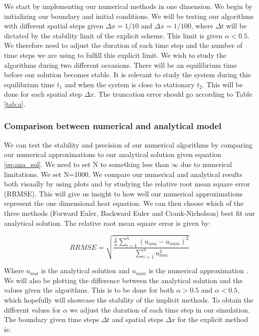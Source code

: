 \documentclass{article}
\begin{document}
\begin{multicols}{2}
We start by implementing our numerical methods in one dimension. We begin by initializing our boundary and initial conditions. We will be testing our algorithms with different spatial steps given $\Delta x =1/10$ and $\Delta x = 1/100$, where $\Delta t$ will be dictated by the stability limit of the explicit scheme. This limit is given $\alpha<0.5$. We therefore need to adjust the duration of each time step and the number of time steps we are using to fulfill this explicit limit. We wish to study the algorithms during two different occasions. There will be an equilibrium time before our solution becomes stable. It is relevant to study the system during this equilibrium time $t_1$ and when the system is close to stationary $t_2$. This will be done for each spatial step $\Delta x$. The truncation error should go according to Table \ref{tab:a}.

\subsubsection{Comparison between numerical and analytical model}

We can test the stability and precision of our numerical algorithms by comparing our numerical approximations to our analytical solution given equation \ref{eq:ana_sol}. We need to set N to something less than $\infty$ due to numerical limitations. We set N=1000. We compare our numerical and analytical results both visually by using plots and by studying the relative root mean square error (RRMSE). This will give us insight to how well our numerical approximations represent the one dimensional heat equation. We can then choose which of the three methods (Forward Euler, Backward Euler and Crank-Nicholson) best fit our analytical solution. The relative root mean square error is given by:

\begin{equation}
RRMSE = \sqrt{\frac{\frac{1}{n}\sum_{i=1}^n(u_{ana}-u_{num})^2}{\sum_{i=1}^n u_{ana}^2}}
\end{equation}

Where $u_{ana}$ is the analytical solution and $u_{num}$ is the numerical approximation \cite{97}. We will also be plotting the difference between the analytical solution and the values given the algorithms. This is to be done for both $\alpha>0.5$ and $\alpha<0.5$, which hopefully will showcase the stability of the implicit methods. To obtain the different values for $\alpha$ we adjust the duration of each time step in our simulation. The boundary given time steps $\Delta t$ and spatial steps $\Delta x$ for the explicit method is:


\end{multicols}
\end{document}
